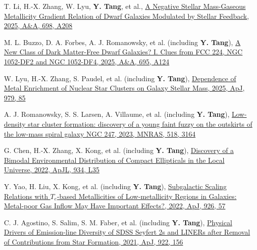 \documentclass[letterpaper,11pt]{article}
\begin{document}
\begin{etaremune}[itemsep=-2pt]
\item T. Li, H.-X. Zhang, W. Lyu, {\bf Y. Tang}, et al., \href{https://ui.adsabs.harvard.edu/abs/2025A%26A...698A.208L/abstract}{A Negative Stellar Mass-Gaseous Metallicity Gradient Relation of Dwarf Galaxies Modulated by Stellar Feedback, 2025, A\&A, 698, A208}
\item M. L. Buzzo, D. A. Forbes, A. J. Romanowsky, et al. (including {\bf Y. Tang}), \href{https://ui.adsabs.harvard.edu/abs/2025A%26A...695A.124B/abstract}{A New Class of Dark Matter-Free Dwarf Galaxies? I. Clues from FCC 224, NGC 1052-DF2 and NGC 1052-DF4,  2025, A\&A, 695, A124}
\item W. Lyu, H.-X. Zhang, S. Paudel, et al. (including {\bf Y. Tang}), \href{https://ui.adsabs.harvard.edu/abs/2025ApJ...979...85L/abstract}{Dependence of Metal Enrichment of Nuclear Star Clusters on Galaxy Stellar Mass, 2025, ApJ, 979, 85}
\item A. J. Romanowsky, S. S. Larsen, A. Villaume, et al. (including {\bf Y. Tang}), \href{https://ui.adsabs.harvard.edu/abs/2023MNRAS.518.3164R/abstract}{Low-density star cluster formation: discovery of a young faint fuzzy on the outskirts of the low-mass spiral galaxy NGC 247, 2023, MNRAS, 518, 3164}
\item G. Chen, H.-X. Zhang, X. Kong, et al. (including {\bf Y. Tang}), \href{https://ui.adsabs.harvard.edu/abs/2022ApJ...934L..35C/abstract}{Discovery of a Bimodal Environmental Distribution of Compact Ellipticals in the Local Universe, 2022, ApJL, 934, L35}
\item Y. Yao, H. Liu, X. Kong, et al. (including {\bf Y. Tang}), \href{https://ui.adsabs.harvard.edu/abs/2022ApJ...926...57Y/abstract}{Subgalactic Scaling Relations with $T_e$-based Metallicities of Low-metallicity Regions in Galaxies: Metal-poor Gas Inflow May Have Important Effects?, 2022, ApJ, 926, 57}
\item C. J. Agostino, S. Salim, S. M. Faber, et al. (including {\bf Y. Tang}), \href{https://ui.adsabs.harvard.edu/abs/2021ApJ...922..156A/abstract}{Physical Drivers of Emission-line Diversity of SDSS Seyfert 2s and LINERs after Removal of Contributions from Star Formation, 2021, ApJ, 922, 156}
\end{etaremune}

\end{document}

